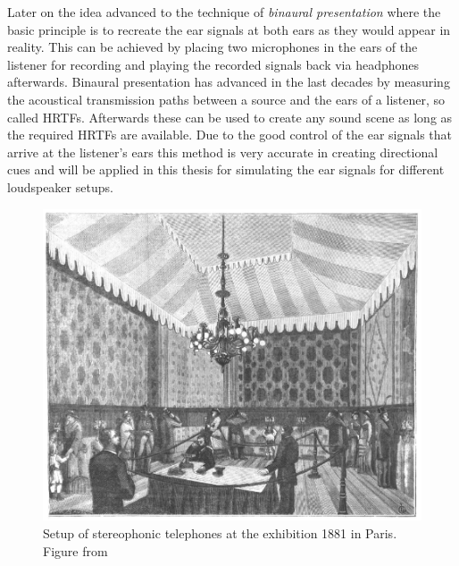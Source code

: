 Later on the idea advanced to the technique of \emph{binaural presentation} where the basic
principle is to recreate the ear signals at both ears as they would appear in reality.
This can
be achieved by placing two microphones in the ears of the listener for recording and playing the
recorded signals back via headphones afterwards.
Binaural presentation has advanced in the last decades by measuring the
acoustical transmission paths between a source and the ears of a listener, so called
\acp{HRTF}. Afterwards these can be used to create any sound scene as long as
the required \acp{HRTF} are available. Due to the good control of the ear signals
that arrive at the listener's ears this method is very accurate in creating directional
cues and will be applied in this thesis for simulating the ear signals for
different loudspeaker setups.
%
\begin{figure}[t]
    \centering
    \includegraphics[width=.8\columnwidth]{fig1_03/fig1_03}
    \caption{Setup of stereophonic telephones at the exhibition 1881 in
    Paris. Figure from \cite{DuMoncel1881a}
    }
    \label{fig:stereo_telephone}
\end{figure}

